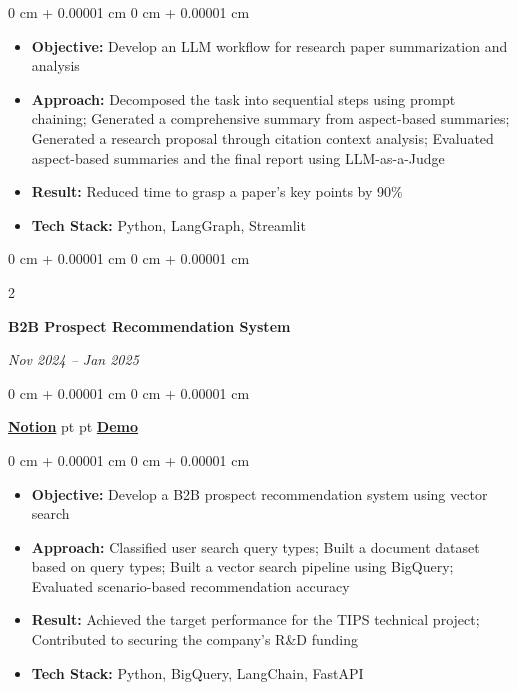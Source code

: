 \documentclass[10pt, letterpaper]{article}
\newenvironment{highlights}{
    \begin{itemize}[
        topsep=0.10 cm,
        parsep=0.10 cm,
        partopsep=0pt,
        itemsep=0pt,
        leftmargin=0 cm + 10pt
    ]
}{
    \end{itemize}
} %
\newenvironment{onecolentry}{
    \begin{adjustwidth}{
        0 cm + 0.00001 cm
    }{
        0 cm + 0.00001 cm
    }
}{
    \end{adjustwidth}
} %
\newenvironment{twocolentry}[2][]{
    \onecolentry
    \def\secondColumn{\textit{#2}}
    \setcolumnwidth{\fill, 4.5 cm}
    \begin{paracol}{2}
}{
    \switchcolumn \raggedleft \secondColumn
    \end{paracol}
    \endonecolentry
} %
\begin{document}
        \vspace{0.10 cm}
        \begin{onecolentry}
            \begin{highlights}
                \item \textbf{Objective:} Develop an LLM workflow for research paper summarization and analysis
                \item \textbf{Approach:} Decomposed the task into sequential steps using prompt chaining; Generated a comprehensive summary from aspect-based summaries; Generated a research proposal through citation context analysis; Evaluated aspect-based summaries and the final report using LLM-as-a-Judge
                \item \textbf{Result:} Reduced time to grasp a paper's key points by 90\%
                \item \textbf{Tech Stack:} Python, LangGraph, Streamlit
            \end{highlights}
        \end{onecolentry}

        \vspace{0.2 cm}
        \begin{twocolentry}{
            Nov 2024 -- Jan 2025
        }
            \textbf{B2B Prospect Recommendation System}
        \end{twocolentry}
        \begin{onecolentry}
            \href{https://awake-kumquat-803.notion.site/B2B-Prospect-Recommendation-System-39f74ec8f703801b9e0becb51039e79a?source=copy_link}{\textbf{Notion}}
             pt
            \AND
             pt
            \href{https://drive.google.com/file/d/15kzsuUMp8jopIicWKQSa0dzpCdr2_sCF/view?usp=drive_link}{\textbf{Demo}}
        \end{onecolentry}

        \vspace{0.10 cm}
        \begin{onecolentry}
            \begin{highlights}
                \item \textbf{Objective:} Develop a B2B prospect recommendation system using vector search
                \item \textbf{Approach:} Classified user search query types; Built a document dataset based on query types; Built a vector search pipeline using BigQuery; Evaluated scenario-based recommendation accuracy
                \item \textbf{Result:} Achieved the target performance for the TIPS technical project; Contributed to securing the company's R\&D funding
                \item \textbf{Tech Stack:} Python, BigQuery, LangChain, FastAPI
            \end{highlights}
        \end{onecolentry}
\end{document}

